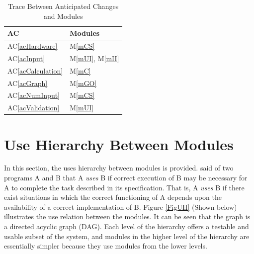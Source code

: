 \documentclass[12pt, titlepage]{article}
\newcommand{\acref}[1]{AC\ref{#1}}
\newcommand{\mref}[1]{M\ref{#1}}
\begin{document}
\begin{table}[H]
\centering
\begin{tabular}{p{} p{}}
\toprule
\textbf{AC} & \textbf{Modules}\\
\midrule
\acref{acHardware} & \mref{mCS}\\
\acref{acInput} & \mref{mUI}, \mref{mII}\\
\acref{acCalculation} & \mref{mC}\\
\acref{acGraph} & \mref{mGO}\\
\acref{acNumInput} & \mref{mCS}\\
\acref{acValidation} & \mref{mUI}\\
\bottomrule
\end{tabular}
\caption{Trace Between Anticipated Changes and Modules}
\label{TblACT}
\end{table}

\section{Use Hierarchy Between Modules} \label{SecUse}

In this section, the uses hierarchy between modules is
provided. \citet{Parnas1978} said of two programs A and B that A {\em uses} B if
correct execution of B may be necessary for A to complete the task described in
its specification. That is, A {\em uses} B if there exist situations in which
the correct functioning of A depends upon the availability of a correct
implementation of B.  Figure \ref{FigUH} (Shown below)  illustrates the use relation between
the modules. It can be seen that the graph is a directed acyclic graph
(DAG). Each level of the hierarchy offers a testable and usable subset of the
system, and modules in the higher level of the hierarchy are essentially simpler
because they use modules from the lower levels.
\end{document}
